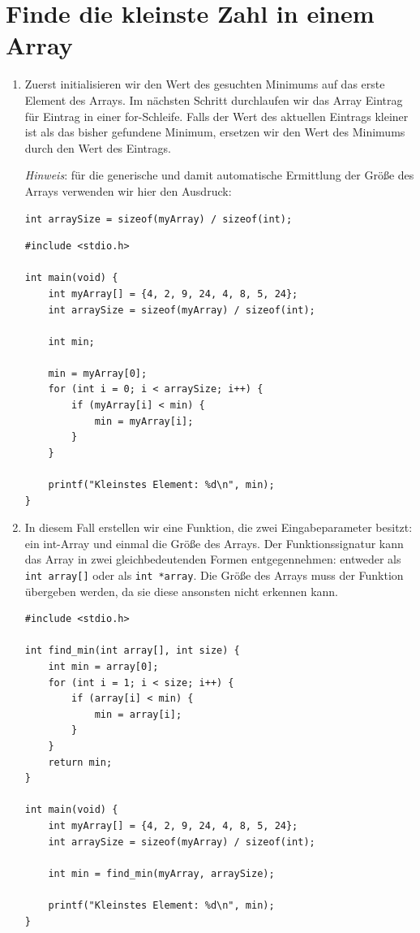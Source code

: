 \chapter{Finde die kleinste Zahl in einem Array}

\begin{enumerate}
  \item Zuerst initialisieren wir den Wert des gesuchten Minimums auf das erste
  Element des Arrays. Im nächsten Schritt durchlaufen wir das Array Eintrag für
  Eintrag in einer for-Schleife. Falls der Wert des aktuellen Eintrags kleiner
  ist als das bisher gefundene Minimum, ersetzen wir den Wert des Minimums
  durch den Wert des Eintrags.

  \textit{Hinweis}: für die generische und damit automatische Ermittlung der
  Größe des Arrays verwenden wir hier den Ausdruck:

\noindent\texttt{int arraySize = sizeof(myArray) / sizeof(int);}

\begin{verbatim}
#include <stdio.h>

int main(void) {
    int myArray[] = {4, 2, 9, 24, 4, 8, 5, 24};
    int arraySize = sizeof(myArray) / sizeof(int);

    int min;

    min = myArray[0];
    for (int i = 0; i < arraySize; i++) {
        if (myArray[i] < min) {
            min = myArray[i];
        }
    }

    printf("Kleinstes Element: %d\n", min);
}
\end{verbatim}

  \item In diesem Fall erstellen wir eine Funktion, die zwei Eingabeparameter
  besitzt: ein int-Array und einmal die Größe des Arrays. Der Funktionssignatur
  kann das Array in zwei gleichbedeutenden Formen entgegennehmen: entweder als
  \texttt{int array[]} oder als \texttt{int *array}. Die Größe
  des Arrays muss der Funktion übergeben werden, da sie diese ansonsten nicht
  erkennen kann.

\begin{verbatim}
#include <stdio.h>

int find_min(int array[], int size) {
    int min = array[0];
    for (int i = 1; i < size; i++) {
        if (array[i] < min) {
            min = array[i];
        }
    }
    return min;
}

int main(void) {
    int myArray[] = {4, 2, 9, 24, 4, 8, 5, 24};
    int arraySize = sizeof(myArray) / sizeof(int);

    int min = find_min(myArray, arraySize);

    printf("Kleinstes Element: %d\n", min);
}
\end{verbatim}

\end{enumerate}



